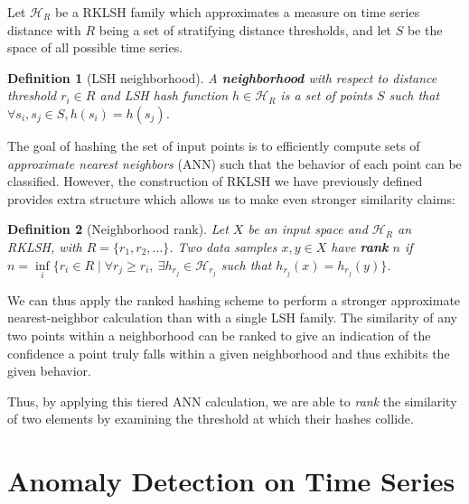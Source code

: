 \documentclass[a4paper]{article}
\theoremstyle{def}
\newtheorem{definition}{Definition}
\theoremstyle{thm}
\newcommand{\LSH}[0]{\mathcal{H}}
\begin{document}
Let ${\LSH}_R$ be a RKLSH family which approximates a measure on time series distance with $R$ being a set of stratifying distance thresholds, and let $S$ be the space of all possible time series.


\begin{definition}[LSH neighborhood]\label{defn:neighborhood}
    A \textbf{neighborhood} with respect to distance threshold $r_i \in R$ and LSH hash function $h \in {\LSH}_R$ is a set of points $S$ such that $\forall s_i, s_j \in S, h(s_i) = h(s_j)$.
\end{definition}

The goal of hashing the set of input points is to efficiently compute sets of \textit{approximate nearest neighbors} (ANN) such that the behavior of each point can be classified.
However, the construction of RKLSH we have previously defined provides extra structure which allows us to make even stronger similarity claims:

\begin{definition}[Neighborhood rank]\label{defn:neighborhood_rank}
    Let $X$ be an input space and ${\LSH}_R$ an RKLSH, with $R = \{r_1, r_2, \ldots\}$.
    Two data samples $x,y \in X$ have \textbf{rank} $n$ if $n = \inf\limits_i\{ r_i \in R \mid \forall r_j \ge r_i,~\exists h_{r_j} \in {\LSH}_{r_j}$ such that $h_{r_j}(x) = h_{r_j}(y) \}$.
\end{definition}

We can thus apply the ranked hashing scheme to perform a stronger approximate nearest-neighbor calculation than with a single LSH family.
The similarity of any two points within a neighborhood can be ranked to give an indication of the confidence a point truly falls within a given neighborhood and thus exhibits the given behavior.

Thus, by applying this tiered ANN calculation, we are able to \textit{rank} the similarity of two elements by examining the threshold at which their hashes collide.

\section{Anomaly Detection on Time Series}
\label{subsec:anomaly_detection}
\end{document}
